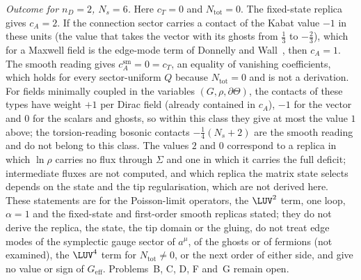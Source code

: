 \emph{Outcome for \(n_D=2\), \(N_s=6\).} Here \(c_T=0\) and \(N_{\mathrm{tot}}=0\). The fixed-state replica gives \(c_A=2\). If the connection sector carries a contact of the Kabat value \(-1\) in these units (the value that takes the vector with its ghosts from \(\tfrac13\) to \(-\tfrac23\)), which for a Maxwell field is the edge-mode term of Donnelly and Wall~\cite{DonnellyWall2016}, then \(c_A=1\). The smooth reading gives \(c_A^{\mathrm{sm}}=0=c_T\), an equality of vanishing coefficients, which holds for every sector-uniform \(Q\) because \(N_{\mathrm{tot}}=0\) and is not a derivation. For fields minimally coupled in the variables \((G,\rho,\partial\Theta)\), the contacts of these types have weight \(+1\) per Dirac field (already contained in \(c_A\)), \(-1\) for the vector and \(0\) for the scalars and ghosts, so within this class they give at most the value \(1\) above; the torsion-reading bosonic contacts \(-\tfrac14(N_s+2)\) are the smooth reading and do not belong to this class. The values \(2\) and \(0\) correspond to a replica in which \(\ln\rho\) carries no flux through \(\Sigma\) and one in which it carries the full deficit; intermediate fluxes are not computed, and which replica the matrix state selects depends on the state and the tip regularisation, which are not derived here. These statements are for the Poisson-limit operators, the \(\LUV^2\) term, one loop, \(\alpha=1\) and the fixed-state and first-order smooth replicas stated; they do not derive the replica, the state, the tip domain or the gluing, do not treat edge modes of the symplectic gauge sector of \(a^\mu\), of the ghosts or of fermions (not examined), the \(\LUV^4\) term for \(N_{\mathrm{tot}}\neq0\), or the next order of either side, and give no value or sign of \(G_{\mathrm{eff}}\). Problems~B, C, D, F and~G remain open.
